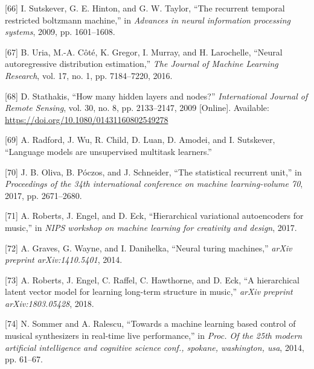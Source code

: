 \documentclass[12pt,]{article}
\begin{document}
\leavevmode\hypertarget{ref-sutskever2009recurrent}{}%
{[}66{]} I. Sutskever, G. E. Hinton, and G. W. Taylor, ``The recurrent
temporal restricted boltzmann machine,'' in \emph{Advances in neural
information processing systems}, 2009, pp. 1601--1608.

\leavevmode\hypertarget{ref-uria2016neural}{}%
{[}67{]} B. Uria, M.-A. Côté, K. Gregor, I. Murray, and H. Larochelle,
``Neural autoregressive distribution estimation,'' \emph{The Journal of
Machine Learning Research}, vol. 17, no. 1, pp. 7184--7220, 2016.

\leavevmode\hypertarget{ref-doi10108001431160802549278}{}%
{[}68{]} D. Stathakis, ``How many hidden layers and nodes?''
\emph{International Journal of Remote Sensing}, vol. 30, no. 8, pp.
2133--2147, 2009 {[}Online{]}. Available:
\url{https://doi.org/10.1080/01431160802549278}

\leavevmode\hypertarget{ref-radford2018language}{}%
{[}69{]} A. Radford, J. Wu, R. Child, D. Luan, D. Amodei, and I.
Sutskever, ``Language models are unsupervised multitask learners.''

\leavevmode\hypertarget{ref-oliva2017statistical}{}%
{[}70{]} J. B. Oliva, B. Póczos, and J. Schneider, ``The statistical
recurrent unit,'' in \emph{Proceedings of the 34th international
conference on machine learning-volume 70}, 2017, pp. 2671--2680.

\leavevmode\hypertarget{ref-roberts2017hierarchical}{}%
{[}71{]} A. Roberts, J. Engel, and D. Eck, ``Hierarchical variational
autoencoders for music,'' in \emph{NIPS workshop on machine learning for
creativity and design}, 2017.

\leavevmode\hypertarget{ref-graves2014neural}{}%
{[}72{]} A. Graves, G. Wayne, and I. Danihelka, ``Neural turing
machines,'' \emph{arXiv preprint arXiv:1410.5401}, 2014.

\leavevmode\hypertarget{ref-roberts2018hierarchical}{}%
{[}73{]} A. Roberts, J. Engel, C. Raffel, C. Hawthorne, and D. Eck, ``A
hierarchical latent vector model for learning long-term structure in
music,'' \emph{arXiv preprint arXiv:1803.05428}, 2018.

\leavevmode\hypertarget{ref-sommer2014towards}{}%
{[}74{]} N. Sommer and A. Ralescu, ``Towards a machine learning based
control of musical synthesizers in real-time live performance,'' in
\emph{Proc. Of the 25th modern artificial intelligence and cognitive
science conf., spokane, washington, usa}, 2014, pp. 61--67.
\end{document}
